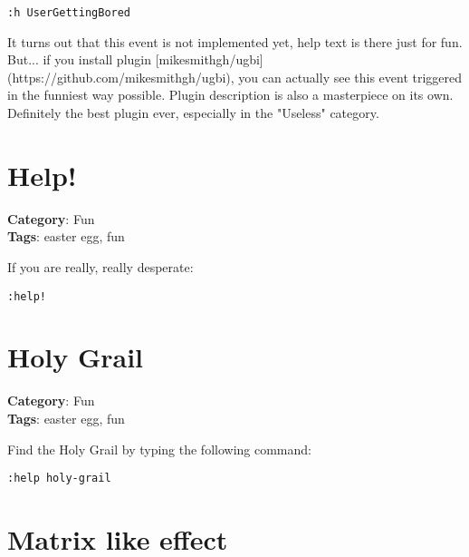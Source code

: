 {{{{{\begin{Exa*}{}
\begin{Verbatim}[fontsize=\footnotesize, breaklines, breakanywhere]
:h UserGettingBored
\end{Verbatim}
\end{Exa*}

It turns out that this event is not implemented yet, help text is there just for fun. But... if you install plugin [mikesmithgh/ugbi](https://github.com/mikesmithgh/ugbi), you can actually see this event triggered in the funniest way possible. Plugin description is also a masterpiece on its own. Definitely the best plugin ever, especially in the "Useless" category.

\section{Help!}

\textbf{Category}: Fun\\ \textbf{Tags}: easter egg, fun
\vspace{0.5cm}

If you are really, really desperate:

\begin{Exa*}{}
\begin{Verbatim}[fontsize=\footnotesize, breaklines, breakanywhere]
:help!
\end{Verbatim}
\end{Exa*}

\section{Holy Grail}

\textbf{Category}: Fun\\ \textbf{Tags}: easter egg, fun
\vspace{0.5cm}

Find the Holy Grail by typing the following command:

\begin{Exa*}{}
\begin{Verbatim}[fontsize=\footnotesize, breaklines, breakanywhere]
:help holy-grail
\end{Verbatim}
\end{Exa*}

\section{Matrix like effect}

}}}}}
